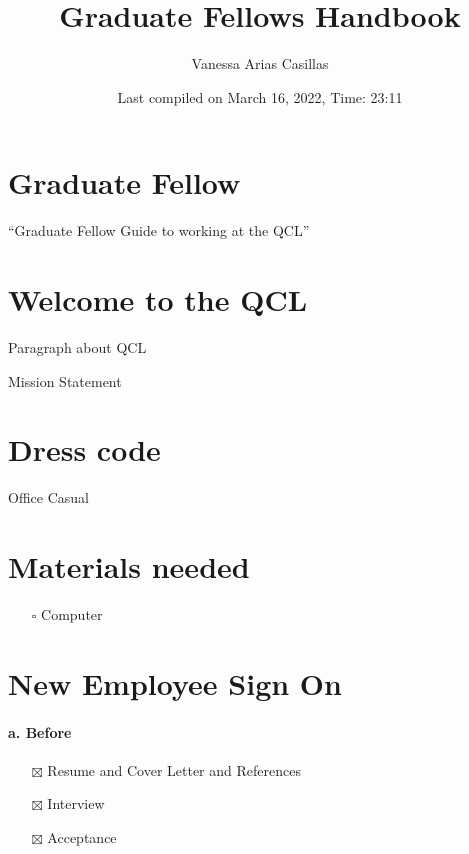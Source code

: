 \documentclass[
]{book}
\title{Graduate Fellows Handbook}
\author{Vanessa Arias Casillas}
\date{Last compiled on March 16, 2022, Time: 23:11}
\providecommand{\tightlist}{%
  \setlength{\itemsep}{0pt}\setlength{\parskip}{0pt}}
\begin{document}
\maketitle

{
\setcounter{tocdepth}{1}
\tableofcontents
}
\hypertarget{graduate-fellow}{%
\chapter{Graduate Fellow}\label{graduate-fellow}}

``Graduate Fellow Guide to working at the QCL''

\hypertarget{welcome-to-the-qcl}{%
\chapter{Welcome to the QCL}\label{welcome-to-the-qcl}}

Paragraph about QCL

Mission Statement

\hypertarget{dress-code}{%
\chapter{Dress code}\label{dress-code}}

Office Casual

\hypertarget{materials-needed}{%
\chapter{Materials needed}\label{materials-needed}}

\begin{itemize}
\tightlist
\item[$\square$]
  Computer
\end{itemize}

\hypertarget{new-employee-sign-on}{%
\chapter{New Employee Sign On}\label{new-employee-sign-on}}

\hypertarget{a.-before}{%
\subsubsection{\texorpdfstring{a. Before }{a. Before }}\label{a.-before}}

\begin{itemize}
\tightlist
\item[$\boxtimes$]
  Resume and Cover Letter and References\\
\item[$\boxtimes$]
  Interview\\
\item[$\boxtimes$]
  Acceptance
\end{itemize}
\end{document}
